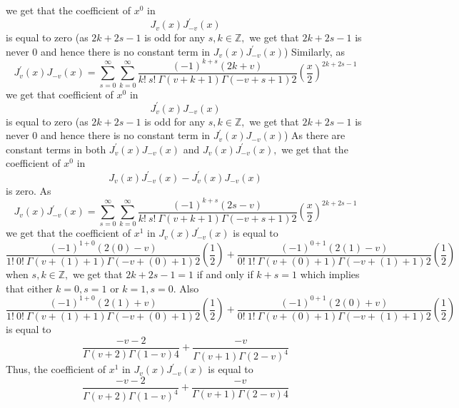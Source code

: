 we get that the coefficient of $x^{0}$ in 
$$J_{v}(x) J_{-v}^{\prime}(x)$$ is equal to zero (as $2 k+2 s-1$ is odd for any $s, k \in \mathbb{Z},$ we get that $2 k+2 s-1$ is never 0 and hence there is no constant term in $J_{v}(x) J_{-v}^{\prime}(x)$) Similarly, as 
$$J_{v}^{\prime}(x) J_{-v}(x)=\sum_{s=0}^{\infty} \sum_{k=0}^{\infty} \frac{(-1)^{k+s}(2 k+v)}{k ! \  s ! \  \Gamma(v+k+1) \Gamma(-v+s+1) 2}\left(\frac{x}{2}\right)^{2 k+2 s-1}$$ 
we get that coefficient of $x^{0}$ in 
$$J_{v}^{\prime}(x) J_{-v}(x)$$ 
is equal to zero (as $2 k+2 s-1$ is odd for any $s, k \in \mathbb{Z},$ we get that $2 k+2 s-1$ is never 0 and hence there is no constant term in $J_{v}^{\prime}(x) J_{-v}(x)$) As there are constant terms in both $J_{v}^{\prime}(x) J_{-v}(x)$ and $J_{v}(x) J_{-v}^{\prime}(x),$ we get that the coefficient of $x^{0}$ in 
$$J_{v}(x) J_{-v}^{\prime}(x)-J_{v}^{\prime}(x) J_{-v}(x)$$ 
is zero. As 
$$J_{v}(x) J_{-v}^{\prime}(x)=\sum_{s=0}^{\infty} \sum_{k=0}^{\infty} \frac{(-1)^{k+s}(2 s-v)}{k ! \  s ! \  \Gamma(v+k+1) \Gamma(-v+s+1) 2}\left(\frac{x}{2}\right)^{2 k+2 s-1}$$
we get that the coefficient
of $x^{1}$ in $J_{v}(x) J_{-v}^{\prime}(x)$ is equal to 
$$\frac{(-1)^{1+0}(2(0)-v)}{1 ! \  0 ! \  \Gamma(v+(1)+1) \Gamma(-v+(0)+1) 2}\left(\frac{1}{2}\right)+\frac{(-1)^{0+1}(2(1)-v)}{0 ! \  1 ! \  \Gamma(v+(0)+1) \Gamma(-v+(1)+1) 2}\left(\frac{1}{2}\right)$$ 
when $s, k \in \mathbb{Z},$ we get that $2 k+2 s-1=1$ if and only if $k+s=1$ which implies that either $k=0, s=1$ or $k=1, s=0$. Also 
$$\frac{(-1)^{1+0}(2(1)+v)}{1 ! \  0 ! \  \Gamma(v+(1)+1) \Gamma(-v+(0)+1) 2}\left(\frac{1}{2}\right)+\frac{(-1)^{0+1}(2(0)+v)}{0 ! \  1 ! \  \Gamma(v+(0)+1) \Gamma(-v+(1)+1) 2}\left(\frac{1}{2}\right)$$
is equal to 
$$\frac{-v-2}{\Gamma(v+2) \Gamma(1-v) 4}+\frac{-v}{\Gamma(v+1) \Gamma(2-v)^{4}}$$
Thus, the coefficient of $x^{1}$ in $J_{v}(x) J_{-v}^{\prime}(x)$ is equal to 
$$\frac{-v-2}{\Gamma(v+2) \Gamma(1-v)^{4}}+\frac{-v}{\Gamma(v+1) \Gamma(2-v) 4}$$

